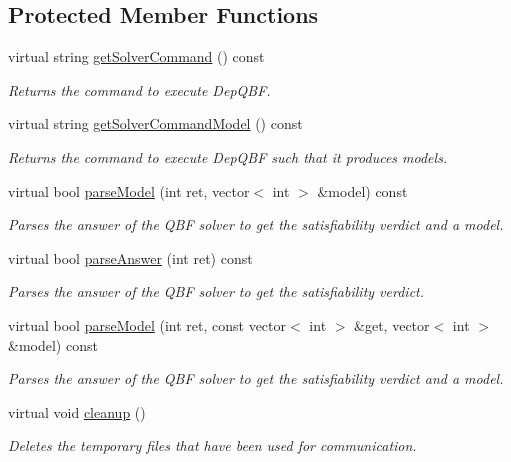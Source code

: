 \subsection*{Protected Member Functions}
\begin{DoxyCompactItemize}
\item 
virtual string \hyperlink{classRareqsExt_a063f7edb8cd60f8bf44c0d16c0131166}{get\-Solver\-Command} () const 
\begin{DoxyCompactList}\small\item\em Returns the command to execute Dep\-Q\-B\-F. \end{DoxyCompactList}\item 
virtual string \hyperlink{classRareqsExt_aeab7d75367b08767e6c1e0411b254961}{get\-Solver\-Command\-Model} () const 
\begin{DoxyCompactList}\small\item\em Returns the command to execute Dep\-Q\-B\-F such that it produces models. \end{DoxyCompactList}\item 
virtual bool \hyperlink{classRareqsExt_aad28d0dc42d65e9409bd9b30a8283941}{parse\-Model} (int ret, vector$<$ int $>$ \&model) const 
\begin{DoxyCompactList}\small\item\em Parses the answer of the Q\-B\-F solver to get the satisfiability verdict and a model. \end{DoxyCompactList}\item 
virtual bool \hyperlink{classExtQBFSolver_a11ddbf3980824453238071e8a036f804}{parse\-Answer} (int ret) const 
\begin{DoxyCompactList}\small\item\em Parses the answer of the Q\-B\-F solver to get the satisfiability verdict. \end{DoxyCompactList}\item 
virtual bool \hyperlink{classExtQBFSolver_afe52ff8faa21fbdd850b73e8f8cf9839}{parse\-Model} (int ret, const vector$<$ int $>$ \&get, vector$<$ int $>$ \&model) const 
\begin{DoxyCompactList}\small\item\em Parses the answer of the Q\-B\-F solver to get the satisfiability verdict and a model. \end{DoxyCompactList}\item 
virtual void \hyperlink{classExtQBFSolver_a3ee48837c5e937e4d3a5b3c2a6b761d3}{cleanup} ()
\begin{DoxyCompactList}\small\item\em Deletes the temporary files that have been used for communication. \end{DoxyCompactList}\end{DoxyCompactItemize}
